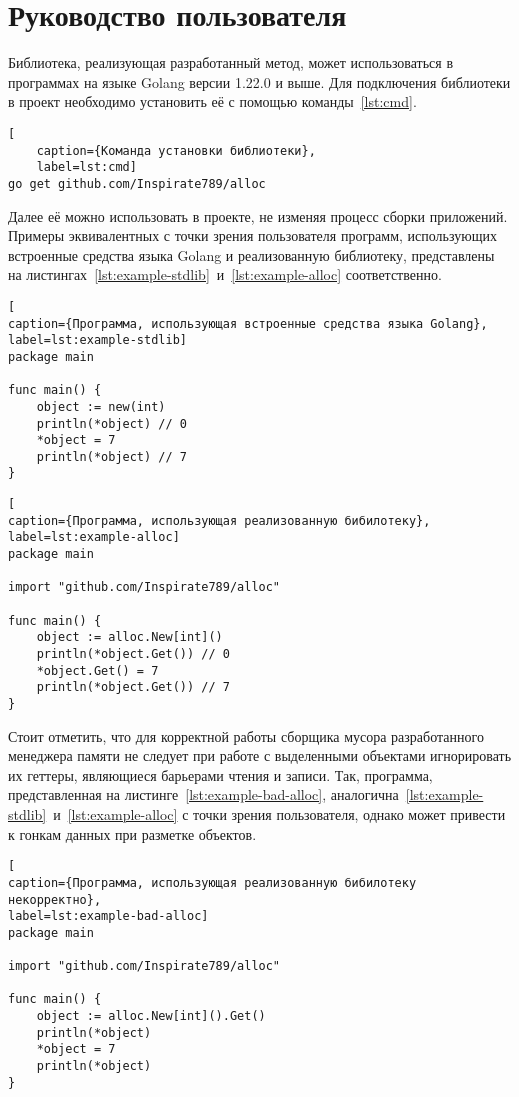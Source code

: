 \section{Руководство пользователя}

Библиотека, реализующая разработанный метод, может использоваться в программах на языке Golang версии 1.22.0 и выше. Для подключения библиотеки в проект необходимо установить её с помощью команды~\ref{lst:cmd}.

\begin{lstlisting}[
	caption={Команда установки библиотеки},
	label=lst:cmd]
go get github.com/Inspirate789/alloc
\end{lstlisting}

Далее её можно использовать в проекте, не изменяя процесс сборки приложений. Примеры эквивалентных с точки зрения пользователя программ, использующих встроенные средства языка Golang и реализованную библиотеку, представлены на листингах~\ref{lst:example-stdlib}~и~\ref{lst:example-alloc} соответственно.

\begin{lstlisting}[
caption={Программа, использующая встроенные средства языка Golang},
label=lst:example-stdlib]
package main

func main() {
	object := new(int)
	println(*object) // 0
	*object = 7
	println(*object) // 7
}
\end{lstlisting}

\begin{lstlisting}[
caption={Программа, использующая реализованную бибилотеку},
label=lst:example-alloc]
package main

import "github.com/Inspirate789/alloc"

func main() {
	object := alloc.New[int]()
	println(*object.Get()) // 0
	*object.Get() = 7
	println(*object.Get()) // 7
}
\end{lstlisting}

Стоит отметить, что для корректной работы сборщика мусора разработанного менеджера памяти не следует при работе с выделенными объектами игнорировать их геттеры, являющиеся барьерами чтения и записи. Так, программа, представленная на листинге~\ref{lst:example-bad-alloc}, аналогична~\ref{lst:example-stdlib}~и~\ref{lst:example-alloc} с точки зрения пользователя, однако может привести к гонкам данных при разметке объектов.

\begin{lstlisting}[
caption={Программа, использующая реализованную бибилотеку некорректно},
label=lst:example-bad-alloc]
package main

import "github.com/Inspirate789/alloc"

func main() {
	object := alloc.New[int]().Get()
	println(*object)
	*object = 7
	println(*object)
}
\end{lstlisting}




